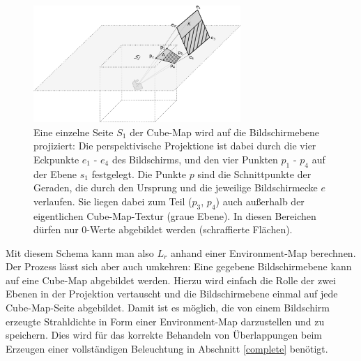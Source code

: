   \begin{figure}[h]
    \centering
    \includegraphics[width=0.7\textwidth]{../graphics/beleuchtung/projektion_cubeside_grey.png}
    \caption[Projektion von Cube-Map-Seite auf Bildschirmebene]{Eine einzelne Seite $S_1$ der Cube-Map wird auf die Bildschirmebene projiziert:
     Die perspektivische Projektione ist dabei durch die vier Eckpunkte $e_1$ - $e_4$ des Bildschirms, und den vier Punkten $p_1$ - $p_4$ auf der Ebene $s_1$ festgelegt. 
    Die Punkte $p$ sind die Schnittpunkte der Geraden, die durch den Ursprung und die jeweilige Bildschirmecke $e$ verlaufen. 
    Sie liegen dabei zum Teil ($p_3$, $p_4$) auch außerhalb der eigentlichen Cube-Map-Textur (graue Ebene). In diesen Bereichen dürfen nur 0-Werte abgebildet werden (schraffierte Flächen).
    }
    \label{fig:projektion_cubeside}
   \end{figure}
    
    Mit diesem Schema kann man also $L_r$ anhand einer Environment-Map berechnen.
    Der Prozess lässt sich aber auch umkehren: Eine gegebene Bildschirmebene kann auf eine Cube-Map abgebildet werden.
    Hierzu wird einfach die Rolle der zwei Ebenen in der Projektion vertauscht und die Bildschirmebene einmal auf jede Cube-Map-Seite abgebildet.
    Damit ist es möglich, die von einem Bildschirm erzeugte Strahldichte in Form einer Environment-Map darzustellen und zu speichern.
    Dies wird für das korrekte Behandeln von Überlappungen beim Erzeugen einer vollständigen Beleuchtung in Abschnitt \ref{complete} benötigt.
  
  
  
